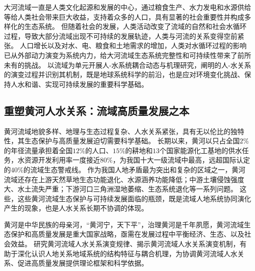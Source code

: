 大河流域一直是人类文化起源和发展的中心，通过粮食生产、水力发电和水源供给等给人类社会带来巨大收益，支持着众多的人口，具有显著的社会重要性并构成多样化的生态系统\cite{best2019}。
但随着社会的发展，人类活动改变了流域的自然和社会水循环过程，导致大部分流域出现不可持续的发展轨迹，人类与河流的关系变得空前紧张\cite{best2019, best2020}。
人口增长以及对水、电、粮食和土地需求的增加\cite{crutzen2006}，人类对水循环过程的影响已从外部动力演变为系统内力，给大河流域生态系统完整性和可持续性带来了前所未有的挑战\cite{dibaldassarre2019}。
以流域为单元开展人-水系统耦合动态与机理研究，阐明的人-水关系的演变过程并识别其机制，既是地球系统科学的前沿，也是应对环境变化挑战、保持人水和谐、实现可持续发展的重要科学基础。

\subsection{重塑黄河人水关系：流域高质量发展之本}

黄河流域地貌多样、地理与生态过程复杂、人水关系紧张，具有无以伦比的独特性，其生态保护与高质量发展迫切需要科学基础。
长期以来，黄河以只占全国$2\%$的年径流量承担着全国$12\%$的人口、$15\%$的耕地和$13$个国家能源化工基地的供水任务，水资源开发利用率一度接近$80\%$，为我国十大一级流域中最高，远超国际认定的$40\%$的流域生态警戒线\cite{mazhuguo2020}。
作为我国人地矛盾最为突出和复杂的区域之一，黄河流域还存在上游天然草地生态功能退化、水源涵养功能降低；中游土壤侵蚀强度大、水土流失严重；下游河口三角洲湿地萎缩、生态系统退化等一系列问题\cite{wohlfart2016a}。
这些，这些黄河流域生态保护与可持续发展面临的瓶颈，既是流域人地系统协同演化产生的现象，也是人水关系长期不协调的体现\cite{fu2021a}。

黄河是中华民族的母亲河，“黄河宁，天下平”，治理黄河是千年夙愿，黄河流域生态保护和高质量发展是重大国家战略，亟需在发展过程中平衡经济、生态、以及社会效益。
研究黄河流域人水关系演变规律、揭示黄河流域人水关系演变机制，有助于深化认识人地关系地域系统的结构特征与耦合机理，为协调黄河流域人水关系、促进高质量发展提供理论框架和科学依据。
